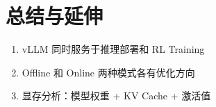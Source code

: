 \section{总结与延伸}
\begin{enumerate}
  \item vLLM 同时服务于推理部署和 RL Training
  \item Offline 和 Online 两种模式各有优化方向
  \item 显存分析：模型权重 + KV Cache + 激活值
\end{enumerate}

